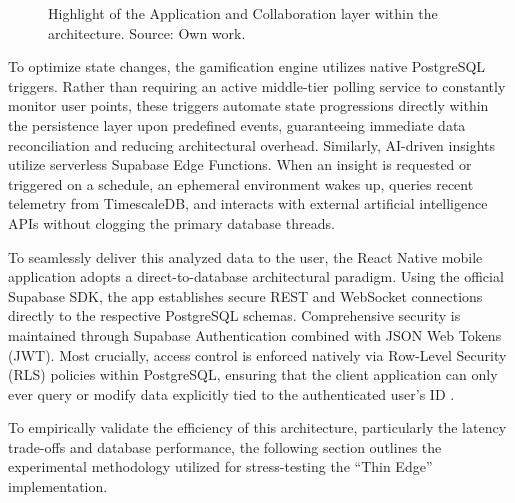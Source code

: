 \begin{figure}[htbp]
    \centering
    \caption{Highlight of the Application and Collaboration layer within the architecture. Source: Own work.}
    \label{fig:application_layer}
\end{figure}
To optimize state changes, the gamification engine utilizes native PostgreSQL triggers. Rather than requiring an active middle-tier polling service to constantly monitor user points, these triggers automate state progressions directly within the persistence layer upon predefined events, guaranteeing immediate data reconciliation and reducing architectural overhead. Similarly, AI-driven insights utilize serverless Supabase Edge Functions. When an insight is requested or triggered on a schedule, an ephemeral environment wakes up, queries recent telemetry from TimescaleDB, and interacts with external artificial intelligence APIs without clogging the primary database threads.

To seamlessly deliver this analyzed data to the user, the React Native mobile application adopts a direct-to-database architectural paradigm. Using the official Supabase SDK, the app establishes secure REST and WebSocket connections directly to the respective PostgreSQL schemas. Comprehensive security is maintained through Supabase Authentication combined with JSON Web Tokens (JWT). Most crucially, access control is enforced natively via Row-Level Security (RLS) policies within PostgreSQL, ensuring that the client application can only ever query or modify data explicitly tied to the authenticated user's ID \cite{broadwaySupabase, supabaseReactNative, tigerdataRelational}.

To empirically validate the efficiency of this architecture, particularly the latency trade-offs and database performance, the following section outlines the experimental methodology utilized for stress-testing the ``Thin Edge'' implementation.
